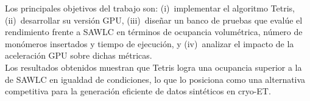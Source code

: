 Los principales objetivos del trabajo son: (i)~implementar el algoritmo Tetris,
(ii)~desarrollar su versión GPU, (iii)~diseñar un banco de pruebas que evalúe el rendimiento frente a SAWLC en términos de ocupancia volumétrica, número de monómeros insertados y tiempo de ejecución, y (iv)~analizar el impacto de la aceleración GPU sobre dichas métricas.\\ 
 

Los resultados obtenidos muestran que Tetris logra una ocupancia superior a la de SAWLC en igualdad de condiciones, lo que lo posiciona como una alternativa competitiva para la generación eficiente de datos sintéticos en cryo-ET.
